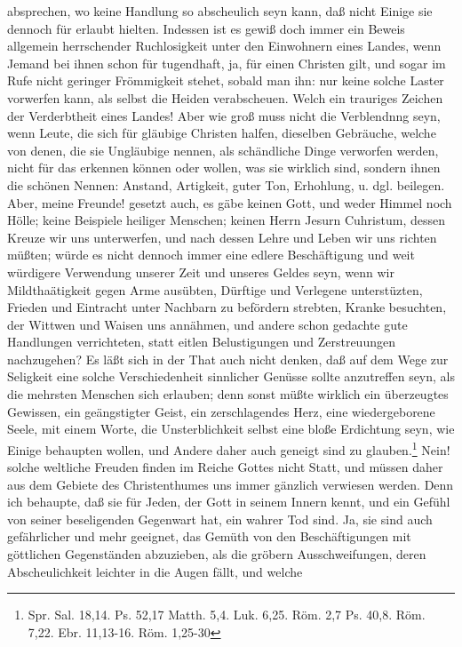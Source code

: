 absprechen, wo keine Handlung so abscheulich seyn kann, daß nicht Einige sie
dennoch für erlaubt hielten. Indessen ist es gewiß doch immer ein Beweis
allgemein herrschender Ruchlosigkeit unter den Einwohnern eines Landes, wenn
Jemand bei ihnen schon für tugendhaft, ja, für einen Christen gilt, und sogar im
Rufe nicht geringer Frömmigkeit stehet, sobald man ihn: nur keine solche Laster
vorwerfen kann, als selbst die Heiden verabscheuen. Welch ein trauriges Zeichen
der Verderbtheit eines Landes! Aber wie groß muss nicht die Verblendnng seyn,
wenn Leute, die sich für gläubige Christen halfen, dieselben Gebräuche, welche
von denen, die sie Ungläubige nennen, als schändliche Dinge verworfen werden,
nicht für das erkennen können oder wollen, was sie wirklich sind, sondern ihnen
die schönen Nennen: Anstand, Artigkeit, guter Ton, Erhohlung, u. dgl. beilegen.
Aber, meine Freunde! gesetzt auch, es gäbe keinen Gott, und weder Himmel noch
Hölle; keine Beispiele heiliger Menschen; keinen Herrn Jesurn Cuhristum, dessen
Kreuze wir uns unterwerfen, und nach dessen Lehre und Leben wir uns richten
müßten; würde es nicht dennoch immer eine edlere Beschäftigung und weit
würdigere Verwendung unserer Zeit und unseres Geldes seyn, wenn wir
Mildthaätigkeit gegen Arme ausübten, Dürftige und Verlegene unterstüzten,
Frieden und Eintracht unter Nachbarn zu befördern strebten, Kranke besuchten,
der Wittwen und Waisen uns annähmen, und andere schon gedachte gute Handlungen
verrichteten, statt eitlen Belustigungen und Zerstreuungen nachzugehen? Es läßt
sich in der That auch nicht denken, daß auf dem Wege zur Seligkeit eine solche
Verschiedenheit sinnlicher Genüsse sollte anzutreffen seyn, als die mehrsten
Menschen sich erlauben; denn sonst müßte wirklich ein überzeugtes Gewissen, ein
geängstigter Geist, ein zerschlagendes Herz, eine wiedergeborene Seele, mit
einem Worte, die Unsterblichkeit selbst eine bloße Erdichtung seyn, wie Einige
behaupten wollen, und Andere daher auch geneigt sind zu glauben.\footnote{Spr.
Sal. 18,14. Ps. 52,17 Matth. 5,4. Luk. 6,25. Röm. 2,7 Ps. 40,8. Röm. 7,22. Ebr.
11,13-16. Röm. 1,25-30} Nein! solche weltliche Freuden finden im Reiche Gottes
nicht Statt, und müssen daher aus dem Gebiete des Christenthumes uns immer
gänzlich verwiesen werden. Denn ich behaupte, daß sie für Jeden, der Gott in
seinem Innern kennt, und ein Gefühl von seiner beseligenden Gegenwart hat, ein
wahrer Tod sind. Ja, sie sind auch gefährlicher und mehr geeignet, das Gemüth
von den Beschäftigungen mit göttlichen Gegenständen abzuzieben, als die gröbern
Ausschweifungen, deren Abscheulichkeit leichter in die Augen fällt, und welche
